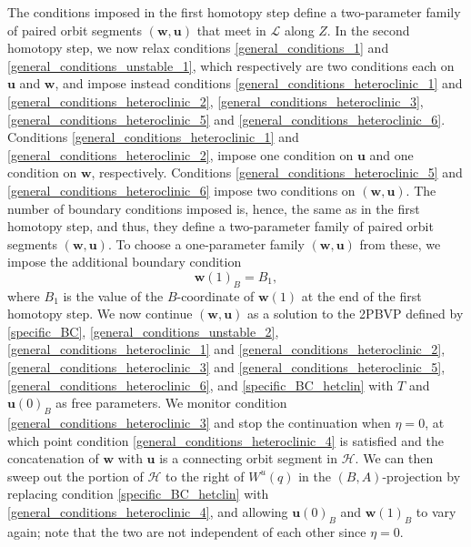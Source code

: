 \documentclass{ws-ijbc}
\begin{document}
The conditions imposed in the first homotopy step define a two-parameter family of paired orbit segments $(\mathbf{w}, \mathbf{u})$ that meet in $\mathscr{L}$ along $Z$.  In the second homotopy step, we now relax conditions \eqref{general_conditions_1} and \eqref{general_conditions_unstable_1}, which respectively are two conditions each on $\mathbf{u}$ and $\mathbf{w}$, and impose instead conditions \eqref{general_conditions_heteroclinic_1} and \eqref{general_conditions_heteroclinic_2}, \eqref{general_conditions_heteroclinic_3}, \eqref{general_conditions_heteroclinic_5} and \eqref{general_conditions_heteroclinic_6}.    Conditions \eqref{general_conditions_heteroclinic_1} and  \eqref{general_conditions_heteroclinic_2}, impose one condition on $\mathbf{u}$ and one condition on $\mathbf{w}$, respectively.  Conditions  \eqref{general_conditions_heteroclinic_5} and \eqref{general_conditions_heteroclinic_6} impose two conditions on $(\mathbf{w},\mathbf{u})$.  The number of boundary conditions imposed is, hence, the same as in the first homotopy step, and thus, they define a two-parameter family of paired orbit segments $(\mathbf{w},\mathbf{u})$.  To choose a one-parameter family $(\mathbf{w},\mathbf{u})$ from these, we impose the additional boundary condition 
%
\begin{equation}
		\mathbf{w}(1)_B = B_1,
		\label{specific_BC_hetclin}
\end{equation}
%
where $B_1$ is the value of the $B$-coordinate of $\mathbf{w}(1)$ at the end of the first homotopy step.  We now continue $(\mathbf{w}, \mathbf{u})$ as a solution to the 2PBVP defined by \eqref{specific_BC}, \eqref{general_conditions_unstable_2}, \eqref{general_conditions_heteroclinic_1} and \eqref{general_conditions_heteroclinic_2}, \eqref{general_conditions_heteroclinic_3} and \eqref{general_conditions_heteroclinic_5}, \eqref{general_conditions_heteroclinic_6}, and \eqref{specific_BC_hetclin} with $T$ and $\mathbf{u}(0)_B$ as free parameters.  We monitor condition \eqref{general_conditions_heteroclinic_3} and stop the continuation when $\eta=0$, at which point condition \eqref{general_conditions_heteroclinic_4} is satisfied and the concatenation of $\mathbf{w}$ with $\mathbf{u}$ is a connecting orbit segment in $\mathscr{H}$.  We can then sweep out the portion of $\mathscr{H}$ to the right of $W^u(q)$ in the $(B,A)$-projection by replacing condition \eqref{specific_BC_hetclin} with \eqref{general_conditions_heteroclinic_4}, and allowing $\mathbf{u}(0)_B$ and $\mathbf{w}(1)_B$ to vary again; note that the two are not independent of each other since $\eta = 0$.
\end{document}
